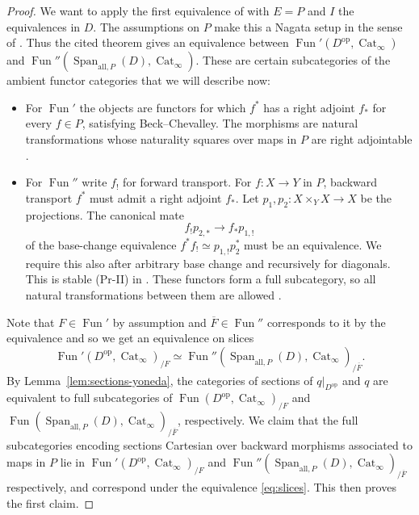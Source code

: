 \documentclass[11pt,a4paper]{article}
\theoremstyle{definition}
\newcommand{\op}{\mathrm{op}}
\newcommand{\Fun}{\operatorname{Fun}}
\newcommand{\Span}{\operatorname{Span}}
\begin{document}
\begin{proof} We want to apply the first equivalence of \cite[Theorem~3.3]{DK} with
$E=P$ and $I$ the equivalences in $D$. The assumptions on $P$ make
this a Nagata setup in the sense of \cite[Definition~2.1]{DK}. Thus the cited theorem gives an equivalence between   $\Fun'(D^{\op},\operatorname{Cat}_\infty)$ and $\Fun''(\Span_{\mathrm{all},P}(D),\operatorname{Cat}_\infty)$.
These are certain subcategories of the ambient functor categories that we will describe now:
\begin{itemize}
\item
For $\Fun'$ the objects are functors for which
$f^*$ has a right adjoint $f_*$ for every $f\in P$, satisfying
Beck--Chevalley. The morphisms are natural transformations
whose naturality squares over maps in $P$ are right adjointable
\cite[Definition~3.1]{DK}.
\item
For $\Fun''$ write $f_!$ for forward transport.
For $f:X\to Y$ in $P$, backward transport $f^*$ must admit a
right adjoint $f_*$. Let $p_1,p_2:X\times_Y X\to X$ be the projections.
The canonical mate
\[
 f_!p_{2,*}\longrightarrow f_*p_{1,!}
\]
of the base-change equivalence
$f^*f_!\simeq p_{1,!}p_2^*$ must be an equivalence.
We require this also after arbitrary base change and recursively
for diagonals. This is stable (Pr-II) in
\cite[Definition~2.6]{DK}.
These functors form a full subcategory, so all natural transformations
between them are allowed \cite[Definition~2.15]{DK}.
\end{itemize}
Note that $F\in\Fun'$ by assumption and $\overline F\in\Fun''$ corresponds to it 
by the equivalence and so we get an equivalence on slices
\begin{equation}\label{eq:slices}
 \Fun'(D^{\op},\operatorname{Cat}_\infty)_{/F}
 \simeq 
 \Fun''(\Span_{\mathrm{all},P}(D),\operatorname{Cat}_\infty)_{/\overline F}.
\end{equation}
By Lemma~\ref{lem:sections-yoneda}, the categories of sections of $q|_{D^{\op}}$ and $q$
are equivalent to full subcategories of
$\Fun(D^{\op},\operatorname{Cat}_\infty)_{/F}$
and $\Fun(\Span_{\mathrm{all},P}(D),\operatorname{Cat}_\infty)_{/\overline F}$, respectively.
We claim that the full subcategories encoding sections Cartesian
over backward morphisms associated to maps in $P$ lie in $
 \Fun'(D^{\op},\operatorname{Cat}_\infty)_{/F}$ and $\Fun''(\Span_{\mathrm{all},P}(D),\operatorname{Cat}_\infty)_{/\overline F}$
respectively, and correspond under the equivalence \eqref{eq:slices}. This then proves the first claim.


\end{proof}
\end{document}
